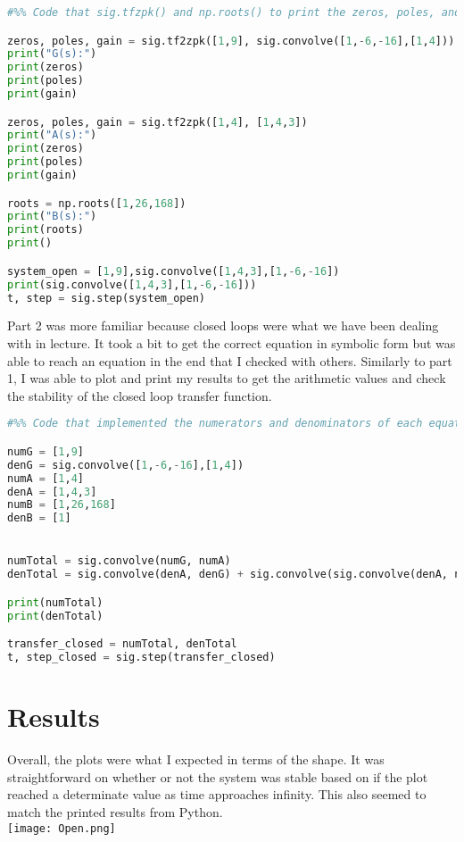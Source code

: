 \documentclass[12pt]{report}
\begin{document}
\begin{lstlisting}[language=Python]
#%% Code that sig.tfzpk() and np.roots() to print the zeros, poles, and gain of the functions and sig.convolve to plot the step response of the open loop transfer function. 

zeros, poles, gain = sig.tf2zpk([1,9], sig.convolve([1,-6,-16],[1,4]))
print("G(s):")
print(zeros)
print(poles)
print(gain)

zeros, poles, gain = sig.tf2zpk([1,4], [1,4,3])
print("A(s):")
print(zeros)
print(poles)
print(gain)

roots = np.roots([1,26,168])
print("B(s):")
print(roots)
print()

system_open = [1,9],sig.convolve([1,4,3],[1,-6,-16])
print(sig.convolve([1,4,3],[1,-6,-16]))
t, step = sig.step(system_open)

\end{lstlisting}


Part 2 was more familiar because closed loops were what we have been dealing with in lecture. It took a bit to get the correct equation in symbolic form but was able to reach an equation in the end that I checked with others. Similarly to part 1, I was able to plot and print my results to get the arithmetic values and check the stability of the closed loop transfer function. 

\begin{lstlisting}[language=Python]
#%% Code that implemented the numerators and denominators of each equation symbolically to use the sig.convolve() to find the resulting transfer function for closed loop and its step response using sig.step(). 

numG = [1,9]
denG = sig.convolve([1,-6,-16],[1,4])
numA = [1,4]
denA = [1,4,3]
numB = [1,26,168]
denB = [1]


numTotal = sig.convolve(numG, numA)
denTotal = sig.convolve(denA, denG) + sig.convolve(sig.convolve(denA, numB), numG)

print(numTotal)
print(denTotal)

transfer_closed = numTotal, denTotal
t, step_closed = sig.step(transfer_closed)
\end{lstlisting}
\section{Results}

Overall, the plots were what I expected in terms of the shape. It was straightforward on whether or not the system was stable based on if the plot reached a determinate value as time approaches infinity. This also seemed to match the printed results from Python. 
\\ \texttt{[image: Open.png]}
\end{document}
